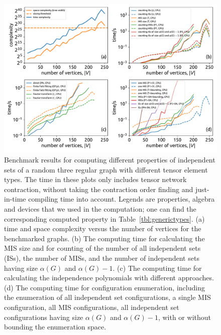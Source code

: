\documentclass[onefignum, onetabnum]{siamart190516}
\newcommand{\<}{\langle}
\renewcommand{\>}{\rangle}
\newcommand{\Tbl}[1]{Table~\ref{#1}}
\begin{document}
\begin{figure} 
    \centering
    \includegraphics[width=\textwidth, trim={0cm 0cm 0cm 0cm}, clip]{figures/fig1.pdf}
    \caption{Benchmark results for computing different properties of independent sets of a random three regular graph with different tensor element types.
    The time in these plots only includes tensor network contraction, without taking the contraction order finding and just-in-time compiling time into account.
    Legends are properties, algebra and devices that we used in the computation; one can find the corresponding computed property in \Tbl{tbl:generictypes}.
    (a) time and space complexity versus the number of vertices for the benchmarked graphs.
    (b) The computing time for calculating the MIS size and for counting of the number of all independent sets (ISs), the number of MISs, and the number of independent sets having size $\alpha(G)$ and $\alpha(G)-1$.
    (c) The computing time for calculating the independence polynomials with different approaches.
    (d) The computing time for configuration enumeration, including the enumeration of all independent set configurations, a single MIS configuration, all MIS configurations, all independent set configurations having size $\alpha(G)$ and $\alpha(G)-1$,  with or without bounding the enumeration space.
    }
    \label{fig:benchmark}
\end{figure}
\end{document}
